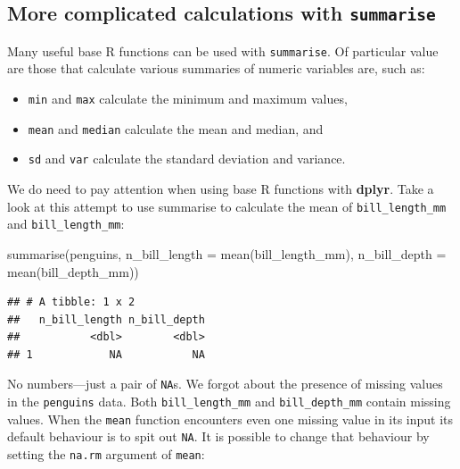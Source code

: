 \documentclass[
]{book}
\newenvironment{Shaded}{\begin{snugshade}}{\end{snugshade}}
\newcommand{\AttributeTok}[1]{\textcolor[rgb]{0.77,0.63,0.00}{#1}}
\newcommand{\FunctionTok}[1]{\textcolor[rgb]{0.00,0.00,0.00}{#1}}
\newcommand{\NormalTok}[1]{#1}
\providecommand{\tightlist}{%
  \setlength{\itemsep}{0pt}\setlength{\parskip}{0pt}}
\begin{document}
\hypertarget{more-complicated-calculations-with-summarise}{%
\subsection{\texorpdfstring{More complicated calculations with \texttt{summarise}}{More complicated calculations with summarise}}\label{more-complicated-calculations-with-summarise}}

Many useful base R functions can be used with \texttt{summarise}. Of particular value are those that calculate various summaries of numeric variables are, such as:

\begin{itemize}
\tightlist
\item
  \texttt{min} and \texttt{max} calculate the minimum and maximum values,
\item
  \texttt{mean} and \texttt{median} calculate the mean and median, and
\item
  \texttt{sd} and \texttt{var} calculate the standard deviation and variance.
\end{itemize}

We do need to pay attention when using base R functions with \textbf{dplyr}. Take a look at this attempt to use summarise to calculate the mean of \texttt{bill\_length\_mm} and \texttt{bill\_length\_mm}:

\begin{Shaded}
\begin{Highlighting}[]
\FunctionTok{summarise}\NormalTok{(penguins, }
          \AttributeTok{n\_bill\_length =} \FunctionTok{mean}\NormalTok{(bill\_length\_mm), }
          \AttributeTok{n\_bill\_depth  =} \FunctionTok{mean}\NormalTok{(bill\_depth\_mm))}
\end{Highlighting}
\end{Shaded}

\begin{verbatim}
## # A tibble: 1 x 2
##   n_bill_length n_bill_depth
##           <dbl>        <dbl>
## 1            NA           NA
\end{verbatim}

No numbers---just a pair of \texttt{NA}s. We forgot about the presence of missing values in the \texttt{penguins} data. Both \texttt{bill\_length\_mm} and \texttt{bill\_depth\_mm} contain missing values. When the \texttt{mean} function encounters even one missing value in its input its default behaviour is to spit out \texttt{NA}. It is possible to change that behaviour by setting the \texttt{na.rm} argument of \texttt{mean}:
\end{document}
